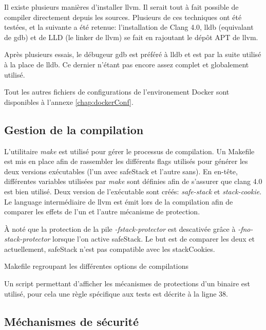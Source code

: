 Il existe plusieurs manières d'installer \gls{llvm}. Il serait tout à fait possible de compiler directement depuis les sources. Plusieurs de ces techniques ont été testées, et la suivante a été retenue: l'installation de Clang 4.0, \gls{lldb} (equivalant de \gls{gdb}) et de LLD (le \og linker \fg de \gls{llvm}) se fait en rajoutant le dépôt APT de \gls{llvm}.

Après plusieurs essais, le débugeur \gls{gdb} est préféré à \gls{lldb} et est par la suite utilisé à la place de \gls{lldb}. Ce dernier n'étant pas encore assez complet et globalement utilisé.

Tout les autres fichiers de configurations de l'environement Docker sont disponibles à l'annexe \ref{chap:dockerConf}.

\subsection{Gestion de la compilation}

L'utilitaire \textit{make} est utilisé pour gérer le processus de compilation. Un Makefile est mis en place afin de rassembler les différents \og flags \fg utilisés pour générer les deux versions exécutables (l'un avec \gls{safeStack} et l'autre sans). En en-tête, différentes variables utilisées par \textit{make} sont définies afin de s'assurer que \gls{clang} 4.0 est bien utilisé. Deux version de l'exécutable sont créés: \textit{safe-stack} et \textit{stack-cookie}. Le language intermédiaire de \gls{llvm} est émit lors de la compilation afin de comparer les effets de l'un et l'autre mécanisme de protection.

À noté que la protection de la pile \textit{-fstack-protector} est descativée grâce à \textit{-fno-stack-protector} lorsque l'on active \gls{safeStack}. Le but est de comparer les deux et actuellement, \gls{safeStack} n'est pas compatible avec les \gls{stackCookies}.

\begin{listing}
	\caption{Makefile regroupant les différentes options de compilations}
	\label{lst:defaultMakefile}
\end{listing}

Un script permettant d'afficher les mécanismes de protections d'un binaire est utilisé, pour cela une règle spécifique aux tests est décrite à la ligne 38.

\subsection{Méchanismes de sécurité}

